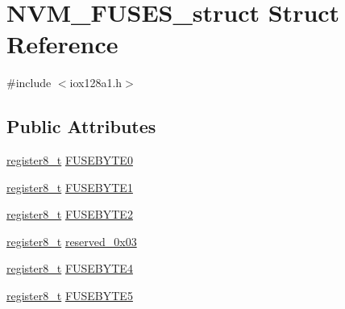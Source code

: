 \hypertarget{struct_n_v_m___f_u_s_e_s__struct}{
\section{NVM\_\-FUSES\_\-struct Struct Reference}
\label{struct_n_v_m___f_u_s_e_s__struct}
}


{\ttfamily \#include $<$iox128a1.h$>$}

\subsection*{Public Attributes}
\begin{DoxyCompactItemize}
\item 
\hyperlink{iox128a1_8h_a6a0649252b392263406882923b04a9db}{register8\_\-t} \hyperlink{struct_n_v_m___f_u_s_e_s__struct_a721e34b70c29f68ed1d3baa170cb27ad}{FUSEBYTE0}
\item 
\hyperlink{iox128a1_8h_a6a0649252b392263406882923b04a9db}{register8\_\-t} \hyperlink{struct_n_v_m___f_u_s_e_s__struct_a22f658f6726849b3673ea12eec83188f}{FUSEBYTE1}
\item 
\hyperlink{iox128a1_8h_a6a0649252b392263406882923b04a9db}{register8\_\-t} \hyperlink{struct_n_v_m___f_u_s_e_s__struct_ae66730c6c7afae7a6388e8516950f84b}{FUSEBYTE2}
\item 
\hyperlink{iox128a1_8h_a6a0649252b392263406882923b04a9db}{register8\_\-t} \hyperlink{struct_n_v_m___f_u_s_e_s__struct_a45b60c8b16424759a7849796eb08c25a}{reserved\_\-0x03}
\item 
\hyperlink{iox128a1_8h_a6a0649252b392263406882923b04a9db}{register8\_\-t} \hyperlink{struct_n_v_m___f_u_s_e_s__struct_af058f1b4be5af5b91ae4d1381a37a1fe}{FUSEBYTE4}
\item 
\hyperlink{iox128a1_8h_a6a0649252b392263406882923b04a9db}{register8\_\-t} \hyperlink{struct_n_v_m___f_u_s_e_s__struct_af6e518b1b1550cd51e69b7ca1cb14733}{FUSEBYTE5}
\end{DoxyCompactItemize}


